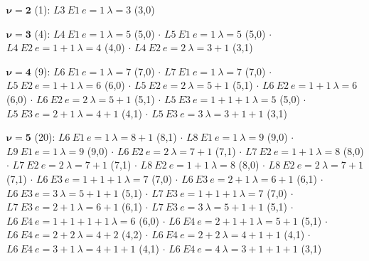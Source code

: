 {\small\sloppy\noindent
$\boldsymbol{\nu = 2}$ (1):\quad
$L3\ E1\ e{=}1\ \lambda{=}3$ (3,0)

\noindent
$\boldsymbol{\nu = 3}$ (4):\quad
$L4\ E1\ e{=}1\ \lambda{=}5$ (5,0) $\cdot$
$L5\ E1\ e{=}1\ \lambda{=}5$ (5,0) $\cdot$
$L4\ E2\ e{=}1{+}1\ \lambda{=}4$ (4,0) $\cdot$
$L4\ E2\ e{=}2\ \lambda{=}3{+}1$ (3,1)

\noindent
$\boldsymbol{\nu = 4}$ (9):\quad
$L6\ E1\ e{=}1\ \lambda{=}7$ (7,0) $\cdot$
$L7\ E1\ e{=}1\ \lambda{=}7$ (7,0) $\cdot$
$L5\ E2\ e{=}1{+}1\ \lambda{=}6$ (6,0) $\cdot$
$L5\ E2\ e{=}2\ \lambda{=}5{+}1$ (5,1) $\cdot$
$L6\ E2\ e{=}1{+}1\ \lambda{=}6$ (6,0) $\cdot$
$L6\ E2\ e{=}2\ \lambda{=}5{+}1$ (5,1) $\cdot$
$L5\ E3\ e{=}1{+}1{+}1\ \lambda{=}5$ (5,0) $\cdot$
$L5\ E3\ e{=}2{+}1\ \lambda{=}4{+}1$ (4,1) $\cdot$
$L5\ E3\ e{=}3\ \lambda{=}3{+}1{+}1$ (3,1)

\noindent
$\boldsymbol{\nu = 5}$ (20):\quad
$L6\ E1\ e{=}1\ \lambda{=}8{+}1$ (8,1) $\cdot$
$L8\ E1\ e{=}1\ \lambda{=}9$ (9,0) $\cdot$
$L9\ E1\ e{=}1\ \lambda{=}9$ (9,0) $\cdot$
$L6\ E2\ e{=}2\ \lambda{=}7{+}1$ (7,1) $\cdot$
$L7\ E2\ e{=}1{+}1\ \lambda{=}8$ (8,0) $\cdot$
$L7\ E2\ e{=}2\ \lambda{=}7{+}1$ (7,1) $\cdot$
$L8\ E2\ e{=}1{+}1\ \lambda{=}8$ (8,0) $\cdot$
$L8\ E2\ e{=}2\ \lambda{=}7{+}1$ (7,1) $\cdot$
$L6\ E3\ e{=}1{+}1{+}1\ \lambda{=}7$ (7,0) $\cdot$
$L6\ E3\ e{=}2{+}1\ \lambda{=}6{+}1$ (6,1) $\cdot$
$L6\ E3\ e{=}3\ \lambda{=}5{+}1{+}1$ (5,1) $\cdot$
$L7\ E3\ e{=}1{+}1{+}1\ \lambda{=}7$ (7,0) $\cdot$
$L7\ E3\ e{=}2{+}1\ \lambda{=}6{+}1$ (6,1) $\cdot$
$L7\ E3\ e{=}3\ \lambda{=}5{+}1{+}1$ (5,1) $\cdot$
$L6\ E4\ e{=}1{+}1{+}1{+}1\ \lambda{=}6$ (6,0) $\cdot$
$L6\ E4\ e{=}2{+}1{+}1\ \lambda{=}5{+}1$ (5,1) $\cdot$
$L6\ E4\ e{=}2{+}2\ \lambda{=}4{+}2$ (4,2) $\cdot$
$L6\ E4\ e{=}2{+}2\ \lambda{=}4{+}1{+}1$ (4,1) $\cdot$
$L6\ E4\ e{=}3{+}1\ \lambda{=}4{+}1{+}1$ (4,1) $\cdot$
$L6\ E4\ e{=}4\ \lambda{=}3{+}1{+}1{+}1$ (3,1)

}
